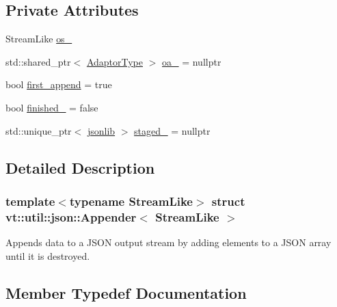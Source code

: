 \subsection*{Private Attributes}
\begin{DoxyCompactItemize}
\item 
Stream\+Like \hyperlink{structvt_1_1util_1_1json_1_1_appender_ab0078667ec1395e92014adc1aaa782e5}{os\+\_\+}
\item 
std\+::shared\+\_\+ptr$<$ \hyperlink{structvt_1_1util_1_1json_1_1_appender_ae7a25e7544d8529cb466651fff13db0b}{Adaptor\+Type} $>$ \hyperlink{structvt_1_1util_1_1json_1_1_appender_a43e091b8545dc6a7664bddc38ffd4e77}{oa\+\_\+} = nullptr
\item 
bool \hyperlink{structvt_1_1util_1_1json_1_1_appender_a1c035d54bb69b9bab1136eab1dd69263}{first\+\_\+append} = true
\item 
bool \hyperlink{structvt_1_1util_1_1json_1_1_appender_aa34d4af41777c8f610e9c93b03a034de}{finished\+\_\+} = false
\item 
std\+::unique\+\_\+ptr$<$ \hyperlink{structvt_1_1util_1_1json_1_1_appender_aa822e25e24db1cdea96f00b79f55f492}{jsonlib} $>$ \hyperlink{structvt_1_1util_1_1json_1_1_appender_a70d829fed542b8958636ba51a6ba2f89}{staged\+\_\+} = nullptr
\end{DoxyCompactItemize}


\subsection{Detailed Description}
\subsubsection*{template$<$typename Stream\+Like$>$\newline
struct vt\+::util\+::json\+::\+Appender$<$ Stream\+Like $>$}

Appends data to a J\+S\+ON output stream by adding elements to a J\+S\+ON array until it is destroyed. 

\subsection{Member Typedef Documentation}
\mbox{\label{structvt_1_1util_1_1json_1_1_appender_ae7a25e7544d8529cb466651fff13db0b}} 

